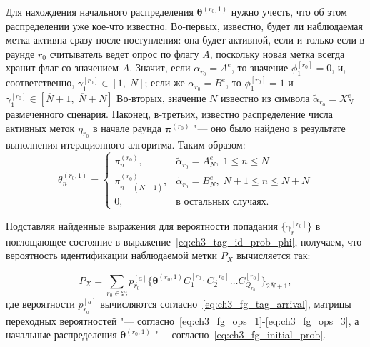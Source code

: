 Для нахождения начального распределения $\bm{\theta}^{(r_0,1)}$ нужно учесть, что об этом распределении уже кое-что известно. Во-первых, известно, будет ли наблюдаемая метка активна сразу после поступления: она будет активной, если и только если в раунде $r_0$ считыватель ведет опрос по флагу $A$, поскольку новая метка всегда хранит флаг со значением $A$. Значит, если $\alpha_{r_0} = A^{e}$, то значение $\phi_1^{[r_0]} = 0$, и, соответственно, $\gamma_1^{[r_0]} \in [1,\; N]$; если же $\alpha_{r_0} = B^{e}$, то $\phi_1^{[r_0]} = 1$ и $\gamma_1^{[r_0]} \in [\overline{N} + 1,\; \overline{N} + N]$ Во-вторых, значение $N$ известно из символа $\widetilde{\alpha}_{r_0} = X^e_N$ размеченного сценария. Наконец, в-третьих, известно распределение числа активных меток $\eta_{r_0}$ в начале раунда $\bm{\pi}^{(r_0)}$ "--- оно было найдено в результате выполнения итерационного алгоритма. Таким образом:
\begin{equation}\label{eq:ch3_fg_initial_prob}
	\theta_n^{(r_0,1)} = \begin{cases}
		\pi^{(r_0)}_n,                      &\widetilde{\alpha}_{r_0} = A^e_N,\; 1 \leqslant n \leqslant N\\
		\pi^{(r_0)}_{n - (\overline{N}+1)}, &\widetilde{\alpha}_{r_0} = B^e_N,\; \overline{N}+1 \leqslant n \leqslant \overline{N}+N\\
		0,                                  &\text{в остальных случаях.}
	\end{cases}
\end{equation}

Подставляя найденные выражения для вероятности попадания $\{ \gamma_r^{[r_0]} \}$ в поглощающее состояние в выражение~\eqref{eq:ch3_tag_id_prob_phi}, получаем, что вероятность идентификации наблюдаемой метки $P_X$ вычисляется так:

$$
	P_X = \sum\limits_{r_0 \in \mathfrak{R}} p_{r_0}^{[a]} \{ \bm{\theta}^{(r_0,1)} C_1^{[r_0]} C_2^{[r_0]} \dots C_{Q_{r_0}}^{[r_0]} \}_{2\overline{N}+1},
$$
где вероятности $p_{r_0}^{[a]}$ вычисляются согласно~\eqref{eq:ch3_fg_tag_arrival}, матрицы переходных вероятностей "--- согласно~\eqref{eq:ch3_fg_ops_1}-\eqref{eq:ch3_fg_ops_3}, а начальные распределения $\bm{\theta}^{(r_0,1)}$ "--- согласно~\eqref{eq:ch3_fg_initial_prob}.






